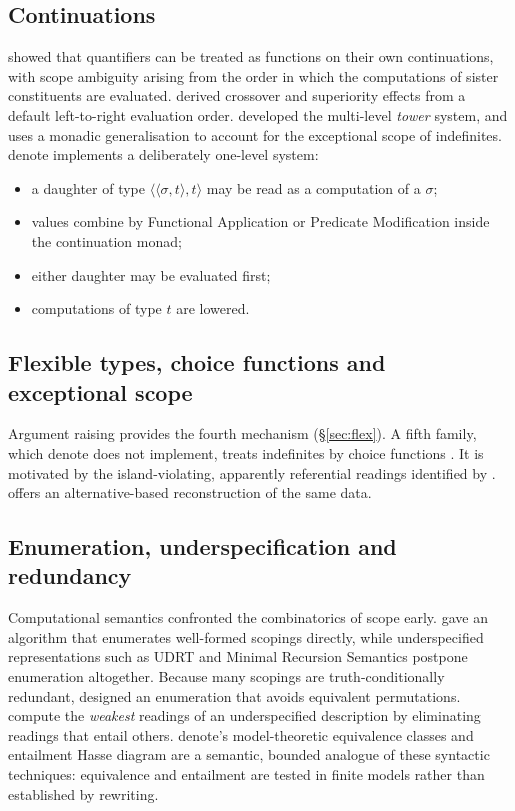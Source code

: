 \documentclass[11pt,a4paper]{article}
\newcommand{\dn}{\textsf{denote}}
\newcommand{\ty}[1]{\langle #1\rangle}
\theoremstyle{definition}
\begin{document}
\subsection{Continuations}
\citet{barker2002} showed that quantifiers can be treated as functions on their own continuations, with scope ambiguity arising from the order in which the computations of sister constituents are evaluated. \citet{shanbarker2006} derived crossover and superiority effects from a default left-to-right evaluation order. \citet{barkershan2014} developed the multi-level \emph{tower} system, and \citet{charlow2020} uses a monadic generalisation to account for the exceptional scope of indefinites. \dn{} implements a deliberately one-level system:
\begin{itemize}
\item a daughter of type $\ty{\ty{\sigma,t},t}$ may be read as a computation of a $\sigma$;
\item values combine by Functional Application or Predicate Modification inside the continuation monad;
\item either daughter may be evaluated first;
\item computations of type $t$ are lowered.
\end{itemize}

\subsection{Flexible types, choice functions and exceptional scope}
Argument raising \citep{hendriks1993} provides the fourth mechanism (\S\ref{sec:flex}). A fifth family, which \dn{} does not implement, treats indefinites by choice functions \citep{reinhart1997,winter1997}. It is motivated by the island-violating, apparently referential readings identified by \citet{fodorsag1982}. \citet{charlow2020} offers an alternative-based reconstruction of the same data.

\subsection{Enumeration, underspecification and redundancy}
Computational semantics confronted the combinatorics of scope early. \citet{hobbsshieber1987} gave an algorithm that enumerates well-formed scopings directly, while underspecified representations such as UDRT \citep{reyle1993} and Minimal Recursion Semantics \citep{copestakeetal2005} postpone enumeration altogether. Because many scopings are truth-conditionally redundant, \citet{vestre1991} designed an enumeration that avoids equivalent permutations. \citet{kollerthater2010} compute the \emph{weakest} readings of an underspecified description by eliminating readings that entail others. \dn{}'s model-theoretic equivalence classes and entailment Hasse diagram are a semantic, bounded analogue of these syntactic techniques: equivalence and entailment are tested in finite models rather than established by rewriting.
\end{document}
